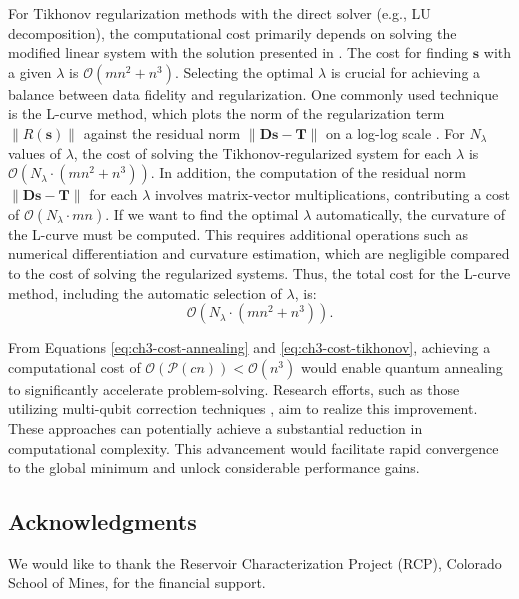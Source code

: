 For Tikhonov regularization methods with the direct solver (e.g., LU decomposition), the computational cost primarily depends on solving the modified linear system with the solution presented in . The cost for finding \(\mathbf{s}\) with a given \(\lambda\) is \(\mathcal{O}(mn^2 + n^3)\). Selecting the optimal \(\lambda\) is crucial for achieving a balance between data fidelity and regularization. One commonly used technique is the L-curve method, which plots the norm of the regularization term \(\|R(\mathbf{s})\|\) against the residual norm \(\|\mathbf{D} \mathbf{s} - \mathbf{T}\|\) on a log-log scale \cite{Hansen2000, CALVETTI2000423}. For \(N_\lambda\) values of \(\lambda\), the cost of solving the Tikhonov-regularized system for each \(\lambda\) is \( \mathcal{O}(N_\lambda \cdot (mn^2 + n^3))\). In addition, the computation of the residual norm \(\|\mathbf{D} \mathbf{s} - \mathbf{T}\|\) for each \(\lambda\) involves matrix-vector multiplications, contributing a cost of \(\mathcal{O}(N_\lambda \cdot mn)\). If we want to find the optimal \(\lambda\) automatically, the curvature of the L-curve must be computed. This requires additional operations such as numerical differentiation and curvature estimation, which are negligible compared to the cost of solving the regularized systems. Thus, the total cost for the L-curve method, including the automatic selection of \(\lambda\), is:
\begin{equation}
    \mathcal{O}(N_\lambda \cdot (mn^2 + n^3)).
    \label{eq:ch3-cost-tikhonov}
\end{equation}

From Equations \ref{eq:ch3-cost-annealing} and \ref{eq:ch3-cost-tikhonov}, achieving a computational cost of \(\mathcal{O}(\mathcal{P}(cn)) < \mathcal{O}(n^3)\) would enable quantum annealing to significantly accelerate problem-solving. Research efforts, such as those utilizing multi-qubit correction techniques \cite{dorband2018methodfindinglowerenergy}, aim to realize this improvement. These approaches can potentially achieve a substantial reduction in computational complexity. This advancement would facilitate rapid convergence to the global minimum and unlock considerable performance gains.

\subsection{Acknowledgments}

We would like to thank the Reservoir Characterization Project (RCP), Colorado School of Mines, for the financial support.

